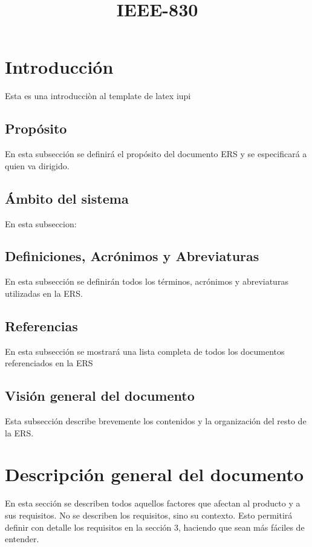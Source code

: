 \documentclass[12pt,a4paper, twosite]{book}
\date{}
\title{IEEE-830}
\begin{document}
\tableofcontents
\newpage


\section{Introducción}
\label{sec:org60390fa}

Esta es una introducciòn al template de latex iupi 

\subsection{Propósito}
\label{sec:org434c3ef}

En esta subsección se definirá el propósito del documento ERS y se
especificará a quien va dirigido.


\subsection{Ámbito del sistema}
\label{sec:org12e44a1}

En esta subseccion:


\subsection{Definiciones, Acrónimos y Abreviaturas}
\label{sec:orgb158e36}

En esta subsección se definirán todos los términos, acrónimos y
abreviaturas utilizadas en la ERS.


\subsection{Referencias}
\label{sec:org62711e0}

En esta subsección se mostrará una lista completa de todos los
documentos referenciados en la ERS


\subsection{Visión general del documento}
\label{sec:orgdaca22c}

Esta subsección describe brevemente los contenidos y la organización
del resto de la ERS.


\section{Descripción general del documento}
\label{sec:orgc1c4017}

En esta sección se describen todos aquellos factores que afectan al
producto y a sus requisitos. No se describen los requisitos, sino su
contexto. Esto permitirá definir con detalle los requisitos en la
sección 3, haciendo que sean más fáciles de entender.
\end{document}
